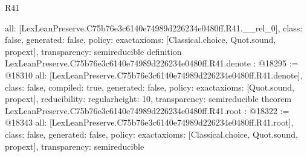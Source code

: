 \begin{lexlean}{R41}
\begin{coremodule}
{  all: [LexLeanPreserve.C75b76e3c6140e74989d226234e0480ff.R41.__rel_0],
  class: false,
  generated: false,
  policy: exact{axioms: [Classical.choice, Quot.sound, propext]},
  transparency: semireducible
}
definition LexLeanPreserve.C75b76e3c6140e74989d226234e0480ff.R41.denote : @18295 := @18310 {
  all: [LexLeanPreserve.C75b76e3c6140e74989d226234e0480ff.R41.denote],
  class: false,
  compiled: true,
  generated: false,
  policy: exact{axioms: [Quot.sound, propext]},
  reducibility: regular{height: 10},
  transparency: semireducible
}
theorem LexLeanPreserve.C75b76e3c6140e74989d226234e0480ff.R41.root : @18322 := @18343 {
  all: [LexLeanPreserve.C75b76e3c6140e74989d226234e0480ff.R41.root],
  class: false,
  generated: false,
  policy: exact{axioms: [Classical.choice, Quot.sound, propext]},
  transparency: semireducible
}


\end{coremodule}
\end{lexlean}
